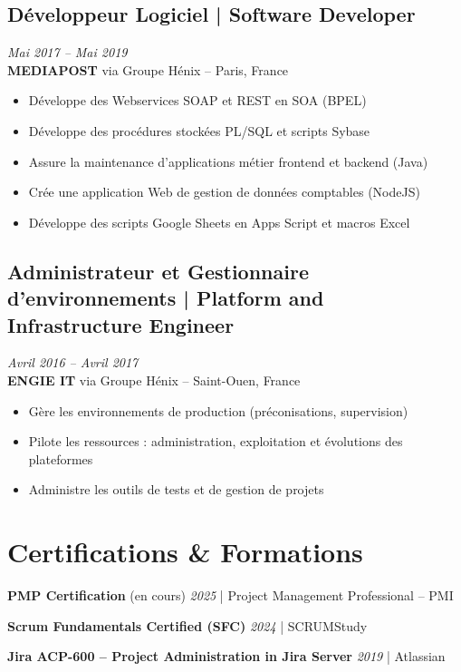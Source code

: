 \documentclass[11pt,a4paper]{article}
\begin{document}
\subsection*{Développeur Logiciel | Software Developer} \hfill \textit{Mai 2017 -- Mai 2019}\\
\textbf{MEDIAPOST} via Groupe Hénix -- Paris, France
\begin{itemize}
    \item Développe des Webservices SOAP et REST en SOA (BPEL)
    \item Développe des procédures stockées PL/SQL et scripts Sybase
    \item Assure la maintenance d'applications métier frontend et backend (Java)
    \item Crée une application Web de gestion de données comptables (NodeJS)
    \item Développe des scripts Google Sheets en Apps Script et macros Excel
\end{itemize}

\subsection*{Administrateur et Gestionnaire d'environnements | Platform and Infrastructure Engineer} \hfill \textit{Avril 2016 -- Avril 2017}\\
\textbf{ENGIE IT} via Groupe Hénix -- Saint-Ouen, France
\begin{itemize}
    \item Gère les environnements de production (préconisations, supervision)
    \item Pilote les ressources : administration, exploitation et évolutions des plateformes
    \item Administre les outils de tests et de gestion de projets
\end{itemize}

\section*{Certifications \& Formations}

\textbf{PMP Certification} (en cours) \hfill \textit{2025} | Project Management Professional -- PMI

\textbf{Scrum Fundamentals Certified (SFC)} \hfill \textit{2024} | SCRUMStudy

\textbf{Jira ACP-600 -- Project Administration in Jira Server} \hfill \textit{2019} | Atlassian
\end{document}
